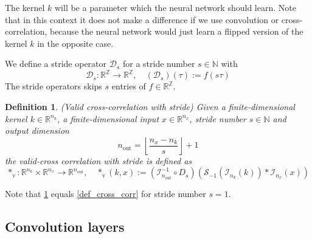 \documentclass[twoside,a4paper]{article}
\newtheorem{definition}{Definition}
\begin{document}

The kernel $k$ will be a parameter which the neural network should learn.
Note that in this context it does not make a difference if we use convolution or cross-correlation, because
the neural network would just learn a flipped version of the kernel $k$ in the opposite case.

We define a stride operator $\mathcal{D}_s$ for a stride number $s \in \mathbb{N}$ with
\begin{equation*}
	\mathcal{D}_s : \mathbb{R}^{\mathbb{Z}} \to \mathbb{R}^{\mathbb{Z}},
	\quad (\mathcal{D}_s)(\tau) := f(s \tau)
\end{equation*}
The stride operators skips $s$ entries of $f \in \mathbb{R}^\mathbb{Z}$.

\begin{definition}\label{def_cross_corr_stride}
	(Valid cross-correlation with stride)
	Given a finite-dimensional kernel $k \in \mathbb{R}^{n_k}$, a finite-dimensional
	input $x \in \mathbb{R}^{n_x}$, stride number $s \in \mathbb{N}$ and output dimension
	\begin{equation*}
		n_{\text{out}} = \left\lfloor \frac{n_x - n_k}{s} \right\rfloor + 1
	\end{equation*}
	the valid-cross correlation with stride is defined as
	\begin{equation*}
		*_{\text{v}} : \mathbb{R}^{n_k} \times \mathbb{R}^{n_x} \to \mathbb{R}^{n_{\text{out}}},
		\quad *_{\text{v}}(k,x) := 
		(\mathcal{I}_{n_{\text{out}}}^{-1} \circ D_s)
		(
			\mathcal{S}_{-1}( \mathcal{I}_{n_k}(k)) * \mathcal{I}_{n_x}(x)
		)
	\end{equation*}
\end{definition}


Note that \cref{def_cross_corr_stride} equals \cref{def_cross_corr} for stride number $s=1$.

\subsection{Convolution layers}
\end{document}

